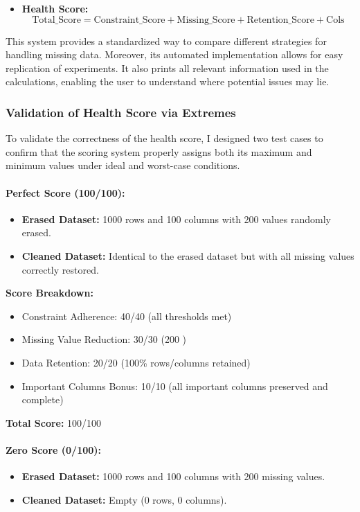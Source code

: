 \documentclass[a4paper,12pt]{article}
\begin{document}
\begin{itemize}
  \item \textbf{Health Score:}
  \[
  \text{Total\_Score} = \text{Constraint\_Score} + \text{Missing\_Score} + \text{Retention\_Score} + \text{Cols}
  \]
\end{itemize}

This system provides a standardized way to compare different strategies for handling missing data. Moreover, its automated implementation allows for easy replication of experiments. It also prints all relevant information used in the calculations, enabling the user to understand where potential issues may lie.

\subsubsection{Validation of Health Score via Extremes}

To validate the correctness of the health score, I designed two test cases to confirm that the scoring system properly assigns both its maximum and minimum values under ideal and worst-case conditions.

\paragraph{Perfect Score (100/100):}
\begin{itemize}
    \item \textbf{Erased Dataset:} 1000 rows and 100 columns with 200 values randomly erased.
    \item \textbf{Cleaned Dataset:} Identical to the erased dataset but with all missing values correctly restored.
\end{itemize}

\textbf{Score Breakdown:}
\begin{itemize}
    \item Constraint Adherence: 40/40 (all thresholds met)
    \item Missing Value Reduction: 30/30 (200 )
    \item Data Retention: 20/20 (100\% rows/columns retained)
    \item Important Columns Bonus: 10/10 (all important columns preserved and complete)
\end{itemize}

\textbf{Total Score:} 100/100

\paragraph{Zero Score (0/100):}
\begin{itemize}
    \item \textbf{Erased Dataset:} 1000 rows and 100 columns with 200 missing values.
    \item \textbf{Cleaned Dataset:} Empty (0 rows, 0 columns).
\end{itemize}
\end{document}
